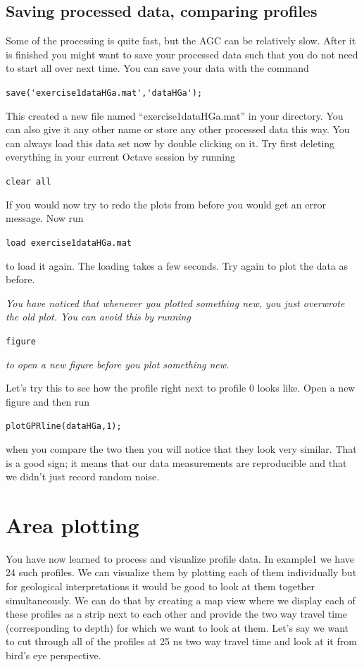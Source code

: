 \documentclass[11pt]{article}
\begin{document}
\subsection{Saving processed data, comparing profiles}

Some of the processing is quite fast, but the AGC can be relatively
slow. After it is finished you might want to
save your processed data such that you do not need to start all over
next time. You can save your data with the command
 
\qquad \verb#save('exercise1dataHGa.mat','dataHGa');#
 
This created a new file named ``exercise1dataHGa.mat'' in your
directory. You can also give it any other name or store any other
processed data this way. You can always load this data set now by
double clicking on it. Try first deleting everything in your current
Octave session by running
 
\qquad \verb#clear all#
 
If you would now try to redo the plots from before you would get an
error message. Now run
 
\qquad \verb#load exercise1dataHGa.mat#
 
to load it again.  The loading takes a few seconds. Try again to plot
the data as before.


\emph{You have noticed that whenever you plotted something new, you
  just overwrote the old plot. You can avoid this by running}

\qquad \verb#figure#

\emph{to open a new figure before you plot something new.}

Let's try this to see how the profile right next to profile 0 looks
like. Open a new figure and then run

\qquad \verb#plotGPRline(dataHGa,1);#
   
when you compare the two then you will notice that they look very
similar. That is a good sign; it means that our data measurements are
reproducible and that we didn't just record random noise.
 

\section{Area plotting}

You have now learned to process and visualize profile data. In
example1 we have 24 such profiles. We can visualize them by plotting
each of them individually but for geological interpretations it would
be good to look at them together simultaneously. We can do that by
creating a map view where we display each of these profiles as a strip
next to each other and provide the two way travel time (corresponding
to depth) for which we want to look at them. Let's say we want to cut
through all of the profiles at 25 ns two way travel time and look at
it from bird's eye perspective.
\end{document}
